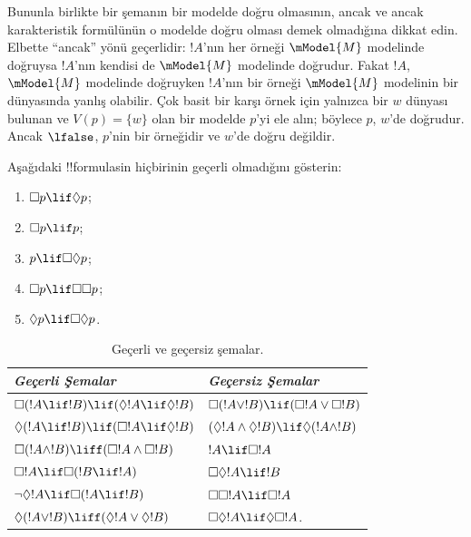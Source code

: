 \documentclass[../../../include/open-logic-section]{subfiles}
\begin{document}
Bununla birlikte bir şemanın bir modelde doğru olmasının, ancak ve ancak
karakteristik formülünün o modelde doğru olması demek olmadığına dikkat
edin. Elbette ``ancak'' yönü geçerlidir: $!A$'nın her örneği
$\mModel{M}$ modelinde doğruysa $!A$'nın kendisi de $\mModel{M}$ modelinde
doğrudur. Fakat $!A$, $\mModel{M}$ modelinde doğruyken $!A$'nın bir örneği
$\mModel{M}$ modelinin bir dünyasında yanlış olabilir. Çok basit bir karşı
örnek için yalnızca bir $w$ dünyası bulunan ve $V(p) = \{w\}$ olan bir
modelde $p$'yi ele alın; böylece $p$, $w$'de doğrudur. Ancak $\lfalse$,
$p$'nin bir örneğidir ve $w$'de doğru değildir.

\begin{prob}
  Aşağıdaki !!{formula}s{}in hiçbirinin geçerli olmadığını gösterin:
  \begin{enumerate}
    \item[\Ax{D}:] \quad $\Box p \lif \Diamond p$;
    \item[\Ax{T}:] \quad $\Box p \lif p$;
    \item[\Ax{B}:] \quad $p \lif \Box\Diamond p$;
    \item[\Ax{4}:] \quad $\Box p \lif \Box \Box p$;
    \item[\Ax{5}:] \quad $\Diamond p \lif \Box \Diamond
      p$.
  \end{enumerate}
\end{prob}

\begin{table}[t]
    \centering
    \begin{tabular}{| l || l |}
      \hline
      {\emph{Geçerli Şemalar}} & {\emph{Geçersiz Şemalar}} \\
      \hline\hline
      $\Box(!A \lif !B) \lif (\Diamond !A \lif \Diamond !B)$
      & $\Box (!A \lor !B) \lif (\Box !A \lor \Box !B)$ \\
      $\Diamond (!A \lif !B) \lif (\Box !A \lif \Diamond
      !B)$
      & $(\Diamond !A \land \Diamond !B) \lif \Diamond (!A
      \land !B)$\\
      $\Box (!A \land !B) \liff (\Box !A \land \Box !B)$
      & $!A \lif \Box !A$ \\
      $\Box !A \lif \Box (!B \lif !A)$
      & $\Box \Diamond !A \lif !B$ \\
      $\lnot \Diamond !A \lif \Box (!A \lif !B)$
      & $\Box \Box !A \lif \Box !A$ \\
      $\Diamond (!A \lor !B) \liff (\Diamond !A \lor
      \Diamond !B)$
      & $\Box \Diamond !A \lif \Diamond \Box !A$. \\
      \hline
    \end{tabular}
    \caption{Geçerli ve geçersiz şemalar.}
\end{table}
\end{document}
